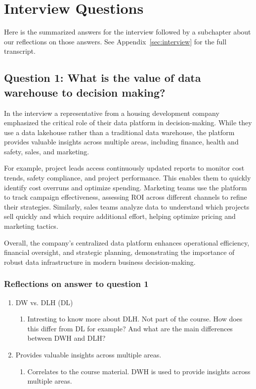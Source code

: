 \section{Interview Questions}
Here is the summarized answers for the interview followed by a subchapter about our reflections on those answers. See Appendix~\ref{sec:interview} for the full transcript.
\subsection{Question 1: What is the value of data warehouse to decision making?}

In the interview a representative from a housing development company emphasized the critical role of their data platform 
in decision-making. While they use a data lakehouse rather than a traditional data warehouse, the platform provides valuable 
insights across multiple areas, including finance, health and safety, sales, and marketing.

For example, project leads access continuously updated reports to monitor cost trends, safety compliance, and project performance. 
This enables them to quickly identify cost overruns and optimize spending. Marketing teams use the platform to track campaign 
effectiveness, assessing ROI across different channels to refine their strategies. Similarly, sales teams analyze data to understand 
which projects sell quickly and which require additional effort, helping optimize pricing and marketing tactics.

Overall, the company's centralized data platform enhances operational efficiency, financial oversight, and strategic planning, 
demonstrating the importance of robust data infrastructure in modern business decision-making.
\subsubsection{Reflections on answer to question 1}
\begin{enumerate}
    \item DW vs. DLH (DL)
    \begin{enumerate}
        \item Intresting to know more about DLH. Not part of the course. How does this differ from DL for example? And what are the main differences between DWH and DLH?
    \end{enumerate}
    \item Provides valuable insights across multiple areas.
    \begin{enumerate}
        \item Correlates to the course material. DWH is used to provide insights across multiple areas.
    \end{enumerate}
\end{enumerate}

